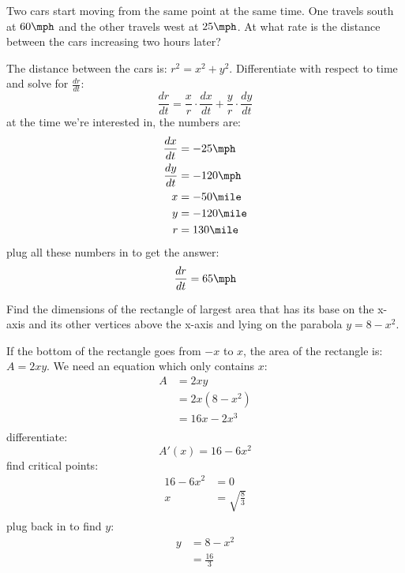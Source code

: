 \documentclass[fleqn,addpoints]{exam}
\begin{document}
\begin{questions}
\ifprintanswers
\pagebreak
\fi

\question 
Two cars start moving from the same point at the same time. One travels south at $60 \mph$ and the other travels west at
$25 \mph$. At what rate is the distance between the cars increasing two hours later?

\begin{solution}
The distance between the cars is: $r^2 = x^2 + y^2$.  Differentiate with respect to time and solve for $\frac{dr}{dt}$:
\[
  \frac{dr}{dt} = \frac{x}{r} \cdot \frac{dx}{dt} + \frac{y}{r} \cdot \frac{dy}{dt}
\]
at the time we're interested in, the numbers are:
\begin{align*}
  \frac{dx}{dt} &= -25 \mph \\
  \frac{dy}{dt} &= -120 \mph \\
  x &= -50 \mile \\
  y &= -120 \mile \\
  r &= 130 \mile \\
\end{align*}
plug all these numbers in to get the answer: 
\[
  \frac{dr}{dt} = 65 \mph
\]

\end{solution}

\ifprintanswers
\pagebreak
\fi

\question Find the dimensions of the rectangle of largest area that has its base on the x-axis and its other vertices
above the x-axis and lying on the parabola $y = 8 - x^2$.

\begin{solution}
If the bottom of the rectangle goes from $-x$ to $x$, the area of the rectangle is: $A = 2xy$.  We need an equation which only contains $x$:
\begin{align*}
  A &= 2xy \\
    &= 2x(8 - x^2) \\
    &= 16x - 2x^3 \\
\end{align*}
differentiate:
\[
  A'(x) = 16 - 6x^2 
\]
find critical points:
\begin{align*}
  16 - 6x^2 &= 0 \\
  x &= \sqrt{\frac{8}{3}} \\
\end{align*}
plug back in to find $y$:
\begin{align*}
  y &= 8 - x^2 \\
    &= \frac{16}{3} \\
\end{align*}
\end{solution}


\end{questions}
\end{document}
